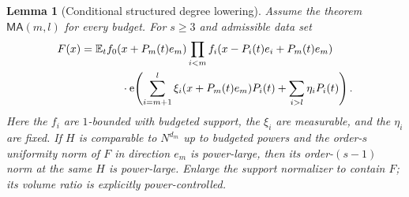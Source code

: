 \documentclass[11pt]{article}
\newtheorem{lemma}[lemma]{Lemma}
\theoremstyle{definition}
\newcommand{\ee}[1]{\mathrm e\!\left(#1\right)}
\begin{document}
\begin{lemma}[Conditional structured degree lowering]\label{patch:conditional-degree}
Assume the theorem $\mathsf{MA}(m,l)$ for every budget.  For $s\geq3$ and admissible data set
\begin{align*}
 F(x)&=\mathbb E_t f_0(x+P_m(t)e_m)
           \prod_{i<m}f_i(x-P_i(t)e_i+P_m(t)e_m)\\
 &\hspace{13mm}\cdot
 \ee{\sum_{i=m+1}^l\xi_i(x+P_m(t)e_m)P_i(t)+\sum_{i>l}\eta_iP_i(t)}.
\end{align*}
Here the $f_i$ are $1$-bounded with budgeted support, the $\xi_i$ are measurable, and the
$\eta_i$ are fixed.  If $H$ is comparable to $N^{d_m}$ up to budgeted powers and the
order-$s$ uniformity norm of $F$ in direction $e_m$ is power-large, then its order-$(s-1)$
norm at the \emph{same} $H$ is power-large.  Enlarge the support normalizer to contain $F$;
its volume ratio is explicitly power-controlled.
\end{lemma}
\end{document}
